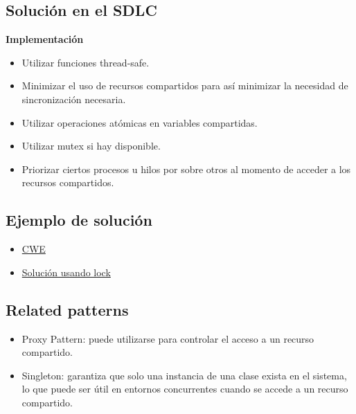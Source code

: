 \subsection*{Solución en el SDLC}

\textbf{Implementación} 

\begin{itemize}
    \item Utilizar funciones thread-safe.
    \item Minimizar el uso de recursos compartidos para así minimizar la necesidad de sincronización necesaria.
    \item Utilizar operaciones atómicas en variables compartidas.
    \item Utilizar mutex si hay disponible.
    \item Priorizar ciertos procesos u hilos por sobre otros al momento de acceder a los recursos compartidos.
\end{itemize}

\subsection*{Ejemplo de solución}

\begin{itemize}
    \item \href{https://cwe.mitre.org/data/definitions/362.html}{CWE}
    \item \href{https://plugins.trac.wordpress.org/changeset?sfp_email=&sfph_mail=&reponame=&new=2794107%40wp-polls%2Ftrunk&old=2729999%40wp-polls%2Ftrunk&sfp_email=&sfph_mail=}{Solución usando lock}
\end{itemize}

\subsection*{Related patterns}

\begin{itemize}
    \item Proxy Pattern: puede utilizarse para controlar el acceso a un recurso compartido.
    \item Singleton: garantiza que solo una instancia de una clase exista en el sistema, lo que puede ser útil en entornos concurrentes cuando se accede a un recurso compartido.
\end{itemize}
